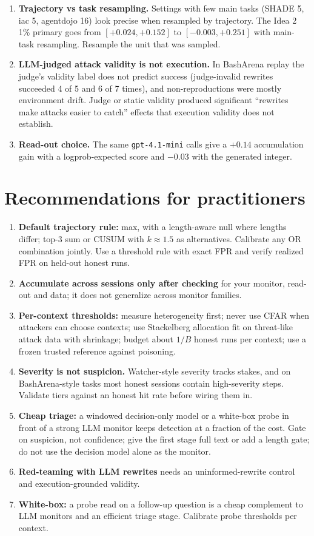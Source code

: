 \documentclass[11pt]{article}
\begin{document}
\begin{enumerate}
\item \textbf{Trajectory vs task resampling.} Settings with few main tasks (SHADE 5, iac 5, agentdojo 16) look precise when resampled by trajectory. The Idea 2 1\% primary goes from $[+0.024, +0.152]$ to $[-0.003, +0.251]$ with main-task resampling. Resample the unit that was sampled.
\item \textbf{LLM-judged attack validity is not execution.} In BashArena replay the judge's validity label does not predict success (judge-invalid rewrites succeeded 4 of 5 and 6 of 7 times), and non-reproductions were mostly environment drift. Judge or static validity produced significant ``rewrites make attacks easier to catch'' effects that execution validity does not establish.
\item \textbf{Read-out choice.} The same \texttt{gpt-4.1-mini} calls give a $+0.14$ accumulation gain with a logprob-expected score and $-0.03$ with the generated integer.
\end{enumerate}

\section{Recommendations for practitioners}
\begin{enumerate}
\item \textbf{Default trajectory rule:} max, with a length-aware null where lengths differ; top-3 sum or CUSUM with $k\approx1.5$ as alternatives. Calibrate any OR combination jointly. Use a threshold rule with exact FPR and verify realized FPR on held-out honest runs.
\item \textbf{Accumulate across sessions only after checking} for your monitor, read-out and data; it does not generalize across monitor families.
\item \textbf{Per-context thresholds:} measure heterogeneity first; never use CFAR when attackers can choose contexts; use Stackelberg allocation fit on threat-like attack data with shrinkage; budget about $1/B$ honest runs per context; use a frozen trusted reference against poisoning.
\item \textbf{Severity is not suspicion.} Watcher-style severity tracks stakes, and on BashArena-style tasks most honest sessions contain high-severity steps. Validate tiers against an honest hit rate before wiring them in.
\item \textbf{Cheap triage:} a windowed decision-only model or a white-box probe in front of a strong LLM monitor keeps detection at a fraction of the cost. Gate on suspicion, not confidence; give the first stage full text or add a length gate; do not use the decision model alone as the monitor.
\item \textbf{Red-teaming with LLM rewrites} needs an uninformed-rewrite control and execution-grounded validity.
\item \textbf{White-box:} a probe read on a follow-up question is a cheap complement to LLM monitors and an efficient triage stage. Calibrate probe thresholds per context.
\end{enumerate}
\end{document}
